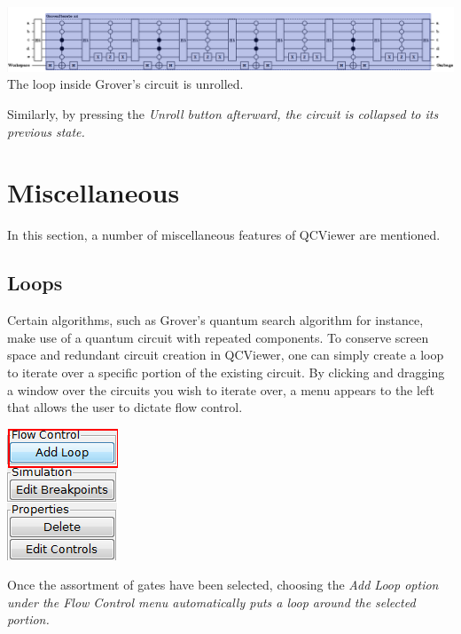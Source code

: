 \documentclass[10pt]{article}
\theoremstyle{definition}
\begin{document}
\begin{center}
\includegraphics[width=170mm]{Figures/SubCircuits/GroverCircuitUnroll} \\
The loop inside Grover's circuit is unrolled.
\end{center}

Similarly, by pressing the \em Unroll \em button afterward, the circuit is collapsed to its previous state. 

\section{Miscellaneous}\label{sec:Miscellaneous}

In this section, a number of miscellaneous features of QCViewer are mentioned.

\subsection{Loops}

Certain algorithms, such as Grover's quantum search algorithm for instance, make use of a quantum circuit with repeated components. To conserve screen space and redundant circuit creation in QCViewer, one can simply create a loop to iterate over a specific portion of the existing circuit. By clicking and dragging a window over the circuits you wish to iterate over, a menu appears to the left that allows the user to dictate flow control.

\begin{center}
\includegraphics{Figures/Misc/LoopsMenu.png}
\end{center}

Once the assortment of gates have been selected, choosing the \em Add Loop \em option under the \em Flow Control \em menu automatically puts a loop around the selected portion. 
\end{document}
